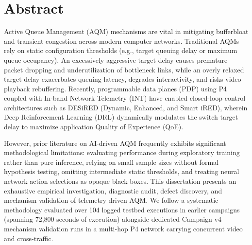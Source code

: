 \documentclass[12pt,a4paper,oneside]{report}
\newcommand{\frontchapter}[1]{%
  \cleardoublepage
  \phantomsection
  \addcontentsline{toc}{chapter}{#1}%
  \chapter*{\centering #1}%
}
\begin{document}
\frontchapter{Abstract}
Active Queue Management (AQM) mechanisms are vital in mitigating bufferbloat and transient congestion across modern computer networks. Traditional AQMs rely on static configuration thresholds (e.g., target queuing delay or maximum queue occupancy). An excessively aggressive target delay causes premature packet dropping and underutilization of bottleneck links, while an overly relaxed target delay exacerbates queuing latency, degrades interactivity, and risks video playback rebuffering. Recently, programmable data planes (PDP) using P4 coupled with In-band Network Telemetry (INT) have enabled closed-loop control architectures such as DESiRED (Dynamic, Enhanced, and Smart iRED), wherein Deep Reinforcement Learning (DRL) dynamically modulates the switch target delay to maximize application Quality of Experience (QoE).

However, prior literature on AI-driven AQM frequently exhibits significant methodological limitations: evaluating performance during exploratory training rather than pure inference, relying on small sample sizes without formal hypothesis testing, omitting intermediate static thresholds, and treating neural network action selections as opaque black boxes. This dissertation presents an exhaustive empirical investigation, diagnostic audit, defect discovery, and mechanism validation of telemetry-driven AQM. We follow a systematic methodology evaluated over 104 logged testbed executions in earlier campaigns (spanning 72,800 seconds of execution) alongside dedicated Campaign v4 mechanism validation runs in a multi-hop P4 network carrying concurrent video and cross-traffic.
\end{document}
